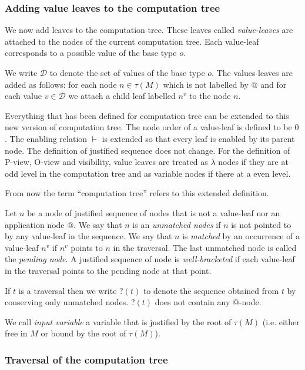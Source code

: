 \subsubsection{Adding value leaves to the computation tree}
\label{sec:adding_value_leaves}

We now add leaves to the computation tree. These leaves called
\emph{value-leaves} are attached to the nodes of the current computation tree.
Each value-leaf corresponds to a possible value of the base type $o$.

We write $\mathcal{D}$ to denote the set of values of the base type $o$.
The values leaves are added as follows: for each node $n \in \tau(M)$ which is not labelled by $@$
and for each value $v \in \mathcal{D}$ we attach a child leaf labelled $n^v$ to the node $n$.

Everything that has been defined for computation tree can be extended to this new version of computation tree.
The node order of a value-leaf is defined to be $0$. The enabling relation $\vdash$ is extended so that every leaf is enabled
by its parent node. The definition of justified sequence does not change.
For the definition of P-view, O-view and visibility, value leaves are treated as $\lambda$ nodes if they are at odd level in the computation tree and
as variable nodes if there at a even level.

From now the term ``computation tree'' refers to this extended definition.


Let $n$ be a node of justified sequence of nodes that is not a value-leaf nor an application node $@$.
We say that $n$ is an \emph{unmatched nodes} if $n$ is not pointed to by any value-leaf in the sequence.
We say that $n$ is \emph{matched} by an occurrence of a value-leaf $n^v$ if $n^v$ points to $n$ in the traversal.
The last unmatched node is called the \emph{pending node}.
A justified sequence of node is \emph{well-bracketed} if
each value-leaf in the traversal points to the pending node at that point.

If $t$ is a traversal then we write $?(t)$ to denote the sequence
obtained from $t$ by conserving only unmatched nodes. $?(t)$ does not contain any $@$-node.

We call \emph{input variable} a variable that is justified by the root of $\tau(M)$ (i.e. either free in $M$ or bound by the root of $\tau(M)$).

\subsubsection{Traversal of the computation tree}
\label{subsec:traversal}


